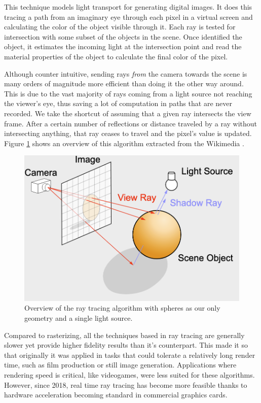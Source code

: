 This technique models light transport for generating digital images. It does this tracing a path from an imaginary eye through each pixel in a virtual screen and calculating the color of the object visible through it. Each ray is tested for intersection with some subset of the objects in the scene. Once identified the object, it estimates the incoming light at the intersection point and read the material properties of the object to calculate the final color of the pixel.

Although counter intuitive, sending rays \textit{from} the camera towards the scene is many orders of magnitude more efficient than doing it the other way around. This is due to the vast majority of rays coming from a light source not reaching the viewer's eye, thus saving a lot of computation in paths that are never recorded. We take the shortcut of assuming that a given ray intersects the view frame. After a certain number of reflections or distance traveled by a ray without intersecting anything, that ray ceases to travel and the pixel's value is updated. Figure \ref{rt-overview-image} shows an overview of this algorithm extracted from the Wikimedia \cite{WikimediaRT}.


\begin{figure}[hbt!]
    \centering
    \includegraphics[width=1.0\textwidth]{figuras/RT-Diagram.png}
    \caption{Overview of the ray tracing algorithm with spheres as our only geometry and a single light source.}
    \label{rt-overview-image}
\end{figure}

Compared to rasterizing, all the techniques based in ray tracing are generally slower yet provide higher fidelity results than it's counterpart. This made it so that originally it was applied in tasks that could tolerate a relatively long render time, such as film production or still image generation. Applications where rendering speed is critical, like videogames, were less suited for these algorithms. However, since 2018, real time ray tracing has become more feasible thanks to hardware acceleration becoming standard in commercial graphics cards.

